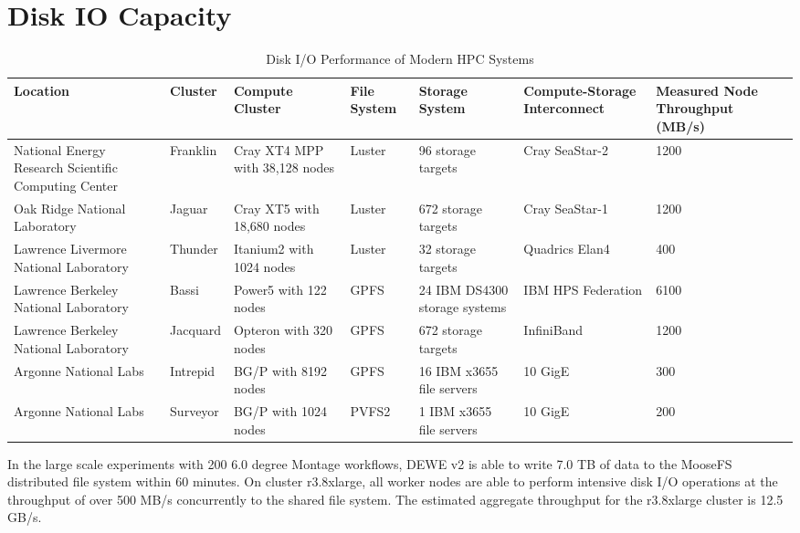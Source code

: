 \section{Disk IO Capacity}
\label{v2_sec:disk_io}



\begin{table}[t!]
\caption{Disk I/O Performance of Modern HPC Systems \cite{borrill2009hpc}} 
\label{tbl:disk_io}
\centering
\begin{tabular}{|p{3.0cm}|p{1.2cm} | p{2.0cm}|p{1.2cm}| p{2.0cm} | p{2.0cm}|p{2.0cm}|}
\hline
Location & Cluster & Compute Cluster & File System & Storage System & Compute-Storage Interconnect & Measured Node Throughput (MB/s)\\ \hline
National Energy Research Scientific Computing Center & Franklin & Cray XT4 MPP with 38,128 nodes & Luster & 96 storage targets & Cray SeaStar-2 & 1200 \\ \hline
Oak Ridge National Laboratory  & Jaguar & Cray XT5 with 18,680 nodes & Luster & 672 storage targets & Cray SeaStar-1 & 1200 \\ \hline
Lawrence Livermore National Laboratory  & Thunder & Itanium2 with 1024 nodes & Luster & 32 storage targets & Quadrics Elan4 & 400 \\ \hline
Lawrence Berkeley National Laboratory & Bassi & Power5 with 122 nodes & GPFS & 24 IBM DS4300 storage systems & IBM HPS Federation & 6100 \\ \hline
Lawrence Berkeley National Laboratory & Jacquard & Opteron with 320 nodes & GPFS & 672 storage targets & InfiniBand & 1200 \\ \hline
Argonne National Labs & Intrepid & BG/P with 8192 nodes & GPFS & 16 IBM x3655 file servers & 10 GigE & 300 \\ \hline
Argonne National Labs & Surveyor & BG/P with 1024 nodes & PVFS2 & 1 IBM x3655 file servers & 10 GigE & 200 \\ \hline
\end{tabular}
\end{table}


In the large scale experiments with 200 6.0 degree Montage workflows, DEWE v2 is able to write 7.0 TB of data to the MooseFS distributed file system within 60 minutes. On cluster r3.8xlarge, all worker nodes are able to perform intensive disk I/O operations at the throughput of over 500 MB/s concurrently to the shared file system. The estimated aggregate throughput for the r3.8xlarge cluster is 12.5 GB/s. 

